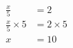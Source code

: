 \documentclass[varwidth]{standalone}
\begin{document}
    \begin{varwidth}{0.25\paperwidth}
    \begin{align*}
    \frac{x}{5} &= 2\\
    \frac{x}{5} \times5 &= 2 \times5\\
    x &= 10\\
\end{align*}
\end{varwidth}
\end{document}
